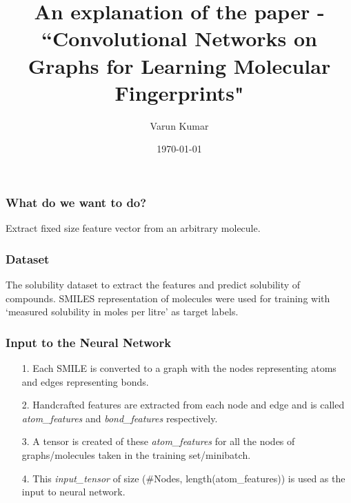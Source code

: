 \documentclass{beamer}
\title[Neural Fingerprint]{An explanation of the paper -\\``Convolutional Networks on Graphs
for Learning Molecular Fingerprints"}
\author{Varun Kumar}
\institute[BITS Pilani]{BITS Pilani\\ K.K. Birla Goa Campus}
\date[TCS I-Lab]{\today}
\begin{document}
\begin{frame}
\titlepage
\end{frame}

\begin{frame}
\frametitle{What do we want to do?}
Extract fixed size feature vector from an arbitrary molecule.
\end{frame}

\begin{frame}
\frametitle{Dataset}
	The solubility dataset \citep{delaney2004esol} to extract the features and predict solubility of compounds.
	\vspace{4px}
	SMILES representation of molecules were used for training with `measured solubility in moles per litre' as target labels.
	\begin{table}[H]
	\centering
	\caption{Snapshot of dataset used}
	\label{dataset}
	\end{table}

\end{frame}


\begin{frame}
\frametitle{Input to the Neural Network}
	\begin{enumerate}
		\item[1.] Each SMILE is converted to a graph with the nodes representing atoms and edges representing bonds.
		
		\item[2.] Handcrafted features are extracted from each node and edge and is called \textit{atom\_features} and \textit{bond\_features} respectively.
		
		\item[3.] A tensor is created of these \textit{atom\_features} for all the nodes of graphs/molecules taken in the training set/minibatch.
		
		\item[4.] This \textit{input\_tensor} of size (\#Nodes, length(atom\_features)) is used as the input to neural network.
	\end{enumerate}
\end{frame}
\end{document}
